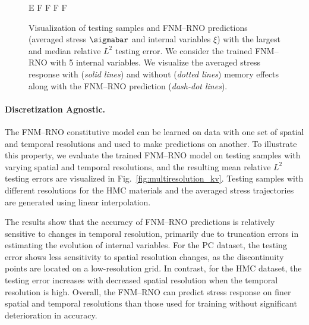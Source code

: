 \documentclass[letterpaper,11pt]{article}
\begin{document}
\begin{figure}[htbp]
{\begin{tabular}{E F F F F}
    \end{tabular}
    \addtolength{\tabcolsep}{6pt}
    }
    \caption{Visualization of testing samples and FNM--RNO predictions (averaged stress $\sigmabar$ and internal variables $\xi$) with the largest and median relative $L^2$ testing error. We consider the trained FNM--RNO with 5 internal variables. We visualize the averaged stress response with (\textit{solid lines}) and without (\textit{dotted lines}) memory effects along with the FNM--RNO prediction (\textit{dash-dot lines}).}
    \label{fig:testing_visual}
\end{figure}

\paragraph{Discretization Agnostic.} The FNM--RNO constitutive model can be learned on data with one set of spatial and temporal resolutions and used to make predictions on another. To illustrate this property, we evaluate the trained FNM--RNO model on testing samples with varying spatial and temporal resolutions, and the resulting mean relative $L^2$ testing errors are visualized in Fig.~\ref{fig:multiresolution_kv}. Testing samples with different resolutions for the HMC materials and the averaged stress trajectories are generated using linear interpolation. 

The results show that the accuracy of FNM--RNO predictions is relatively sensitive to changes in temporal resolution, primarily due to truncation errors in estimating the evolution of internal variables. For the PC dataset, the testing error shows less sensitivity to spatial resolution changes, as the discontinuity points are located on a low-resolution grid. In contrast, for the HMC dataset, the testing error increases with decreased spatial resolution when the temporal resolution is high. Overall, the FNM--RNO can predict stress response on finer spatial and temporal resolutions than those used for training without significant deterioration in accuracy.
\end{document}
